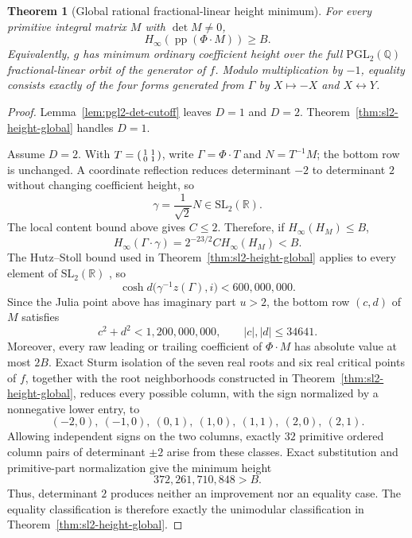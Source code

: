 \documentclass[11pt]{article}
\newtheorem{theorem}{Theorem}[section]
\begin{document}
\begin{theorem}[Global rational fractional-linear height minimum]\label{thm:pgl2-height-global}
For every primitive integral matrix $M$ with $\det M\ne0$,
\[
 H_\infty\!\left(\operatorname{pp}(\Phi\mathbin{\cdot}M)\right)\ge B.
\]
Equivalently, $g$ has minimum ordinary coefficient height over the full $\mathrm{PGL}_2(\mathbb Q)$ fractional-linear orbit of the generator of $f$.  Modulo multiplication by $-1$, equality consists exactly of the four forms generated from $\Gamma$ by $X\mapsto-X$ and $X\leftrightarrow Y$.
\end{theorem}

\begin{proof}
Lemma~\ref{lem:pgl2-det-cutoff} leaves $D=1$ and $D=2$.  Theorem~\ref{thm:sl2-height-global} handles $D=1$.

Assume $D=2$.  With $T=\begin{psmallmatrix}1&1\\0&1\end{psmallmatrix}$, write $\Gamma=\Phi\mathbin{\cdot}T$ and $N=T^{-1}M$; the bottom row is unchanged.  A coordinate reflection reduces determinant $-2$ to determinant $2$ without changing coefficient height, so
\[
 \gamma=\frac{1}{\sqrt2}N\in\mathrm{SL}_2(\mathbb R).
\]
The local content bound above gives $C\le2$.  Therefore, if $H_\infty(H_M)\le B$,
\[
 H_\infty(\Gamma\mathbin{\cdot}\gamma)
 =2^{-23/2}C H_\infty(H_M)<B.
\]
The Hutz--Stoll bound used in Theorem~\ref{thm:sl2-height-global} applies to every element of $\mathrm{SL}_2(\mathbb R)$ \cite[Theorem~4.7]{HutzStoll2019}, so
\[
 \cosh d\bigl(\gamma^{-1}z(\Gamma),i\bigr)<600{,}000{,}000.
\]
Since the Julia point above has imaginary part $u>2$, the bottom row $(c,d)$ of $M$ satisfies
\[
 c^2+d^2<1{,}200{,}000{,}000,
 \qquad |c|,|d|\le34641.
\]
Moreover, every raw leading or trailing coefficient of $\Phi\mathbin{\cdot}M$ has absolute value at most $2B$.  Exact Sturm isolation of the seven real roots and six real critical points of $f$, together with the root neighborhoods constructed in Theorem~\ref{thm:sl2-height-global}, reduces every possible column, with the sign normalized by a nonnegative lower entry, to
\[
 (-2,0),\ (-1,0),\ (0,1),\ (1,0),\ (1,1),\ (2,0),\ (2,1).
\]
Allowing independent signs on the two columns, exactly $32$ primitive ordered column pairs of determinant $\pm2$ arise from these classes.  Exact substitution and primitive-part normalization give the minimum height
\[
 372{,}261{,}710{,}848>B.
\]
Thus, determinant $2$ produces neither an improvement nor an equality case.  The equality classification is therefore exactly the unimodular classification in Theorem~\ref{thm:sl2-height-global}.
\end{proof}
\end{document}
